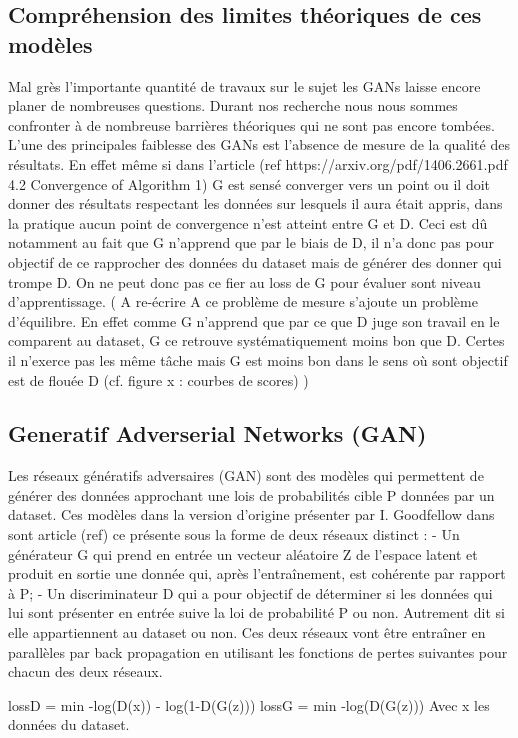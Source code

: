 \documentclass[11pt,francais]{article}
\begin{document}
\subsection{Compréhension des limites théoriques de ces modèles}
Mal grès l'importante quantité de travaux sur le sujet les GANs laisse encore planer de nombreuses questions.
Durant nos recherche nous nous sommes confronter à de nombreuse barrières théoriques qui ne sont pas encore tombées. 
L'une des principales faiblesse des GANs est l'absence de mesure de la qualité des résultats. En effet même si dans l'article (ref https://arxiv.org/pdf/1406.2661.pdf 4.2  Convergence of Algorithm 1) G est sensé converger vers un point ou il doit donner des résultats respectant les données sur lesquels il aura était appris, dans la pratique aucun point de convergence n'est atteint entre G et D. Ceci est dû notamment au fait que G n'apprend que par le biais de D, il n'a donc pas pour objectif de ce rapprocher des données du dataset mais de générer des donner qui trompe D. On ne peut donc pas ce fier au loss de G pour évaluer sont niveau d'apprentissage.
( A re-écrire 
A ce problème de mesure s'ajoute un problème d'équilibre.
En effet comme G n'apprend que par ce que D juge son travail en le comparent au dataset, G ce retrouve systématiquement moins bon que D. Certes il n'exerce pas les même tâche mais G est moins bon dans le sens où sont objectif est de flouée D (cf. figure x : courbes de scores) 
)

\subsection{Generatif Adverserial Networks (GAN)}
Les réseaux génératifs adversaires (GAN) sont des modèles qui permettent de générer des données approchant une lois de probabilités cible P données par un dataset.
Ces modèles dans la version d'origine présenter par I. Goodfellow dans sont article (ref) ce présente sous la forme de deux réseaux distinct :
  - Un générateur G qui prend en entrée un vecteur aléatoire Z de l'espace latent et produit en sortie une donnée qui, après l'entraînement, est cohérente par rapport à P;
  - Un discriminateur D qui a pour objectif de déterminer si les données qui lui sont présenter en entrée suive la loi de probabilité P ou non. Autrement dit si elle appartiennent au dataset ou non.
Ces deux réseaux vont être entraîner en parallèles par back propagation en utilisant les fonctions de pertes suivantes pour chacun des deux réseaux.

lossD = min -log(D(x)) - log(1-D(G(z)))
lossG = min -log(D(G(z)))
Avec x les données du dataset.
\end{document}

